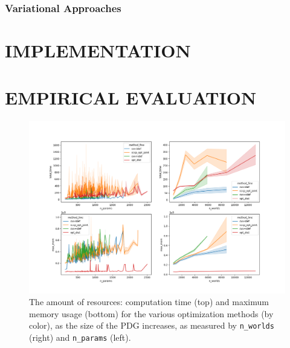 \documentclass[twoside]{article}
\begin{document}
\subsubsection{Variational Approaches}




\section{IMPLEMENTATION} \label{sec:implementation}
\section{EMPIRICAL EVALUATION} \label{sec:expts}

\begin{figure}
    \includegraphics[width=\linewidth]{figs/resources-fine}
    \caption{
        The amount of resources: computation time (top) and maximum memory usage (bottom) for the various optimization methods (by color), as the size of the PDG increases, as measured by \texttt{n\_worlds} (right) and \texttt{n\_params} (left).
     }\label{fig:resources}
\end{figure}
\end{document}
